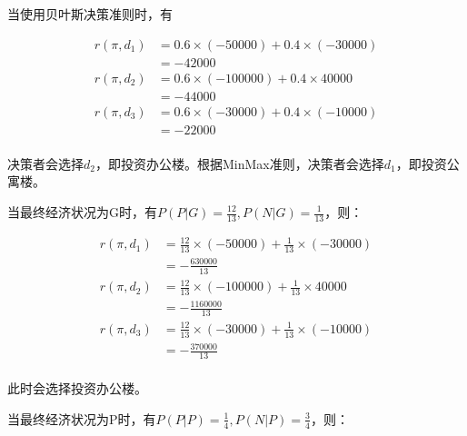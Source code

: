 \documentclass{../notes}
\begin{document}
    \begin{subquestions}
        \item 当使用贝叶斯决策准则时，有

        \begin{equation}
            \begin{aligned}
                r(\pi, d_1) &= 0.6\times (-50000) + 0.4\times (-30000) \\
                &= -42000 \\
                r(\pi, d_2) &= 0.6\times (-100000) + 0.4\times 40000 \\
                &= -44000 \\
                r(\pi, d_3) &= 0.6\times (-30000) + 0.4\times (-10000) \\
                &= -22000 \\
            \end{aligned}
        \end{equation}

        决策者会选择$d_2$，即投资办公楼。根据MinMax准则，决策者会选择$d_1$，即投资公寓楼。

        \item 当最终经济状况为G时，有$P(P|G) = \frac{12}{13}, P(N|G) = \frac{1}{13}$，则：

        \begin{equation}
            \begin{aligned}
                r(\pi, d_1) &= \frac{12}{13}\times (-50000) + \frac{1}{13}\times (-30000) \\
                &= -\frac{630000}{13} \\
                r(\pi, d_2) &= \frac{12}{13}\times (-100000) + \frac{1}{13}\times 40000 \\
                &= -\frac{1160000}{13} \\
                r(\pi, d_3) &= \frac{12}{13}\times (-30000) + \frac{1}{13}\times (-10000) \\
                &= -\frac{370000}{13} \\
            \end{aligned}
        \end{equation}

        此时会选择投资办公楼。

        当最终经济状况为P时，有$P(P|P) = \frac{1}{4}, P(N|P) = \frac{3}{4}$，则：


\end{subquestions}
\end{document}
